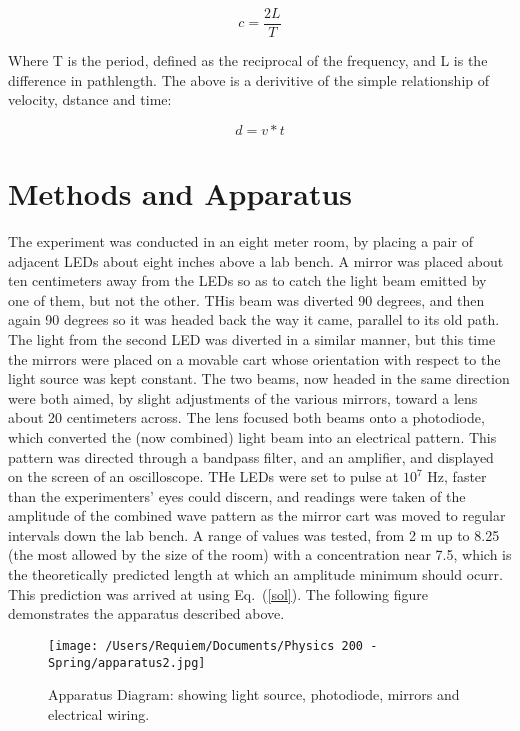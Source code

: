 \documentclass[aps,pre,twocolumn,nofootinbib]{revtex4}
\begin{document}
\begin{equation}
\label{sol}
c=\frac{2L}{T}
\end{equation}

Where T is the period, defined as the reciprocal of the frequency, and L is the difference in pathlength.  The above is a derivitive of the simple relationship of velocity, dstance and time: 

\begin{equation}
\label{velocity}
d=v*t
\end{equation}

\section{Methods and Apparatus}

The experiment was conducted in an eight meter room, by placing a pair of adjacent LEDs about eight inches above a lab bench.  A mirror was placed about ten centimeters away from the LEDs so as to catch the light beam emitted by one of them, but not the other.  THis beam was diverted 90 degrees, and then again 90 degrees so it was headed back the way it came, parallel to its old path.  The light from the second LED was diverted in a similar manner, but this time the mirrors were placed on a movable cart whose orientation with respect to the light source was kept constant. The two beams, now headed in the same direction were both aimed, by slight adjustments of the various mirrors, toward a lens about 20 centimeters across.  The lens focused both beams onto a photodiode, which converted the (now combined) light beam into an electrical pattern.  This pattern was directed through a bandpass filter, and an amplifier, and displayed on the screen of an oscilloscope.  THe LEDs were set to pulse at $10^7$ Hz, faster than the experimenters' eyes could discern, and readings were taken of the amplitude of the combined wave pattern as the mirror cart was moved to regular intervals down the lab bench.  A range of values was tested, from 2 m up to 8.25 (the most allowed by the size of the room) with a concentration near 7.5, which is the theoretically predicted length at which an amplitude minimum should ocurr.  This prediction was arrived at using Eq.~(\ref{sol}).  The following figure demonstrates the apparatus described above.  

\begin{figure}[h]
\centering
\texttt{[image: /Users/Requiem/Documents/Physics 200 - Spring/apparatus2.jpg]} 
\caption{Apparatus Diagram: showing light source, photodiode, mirrors and electrical wiring. }
\label{hight}
\end{figure}
\end{document}
